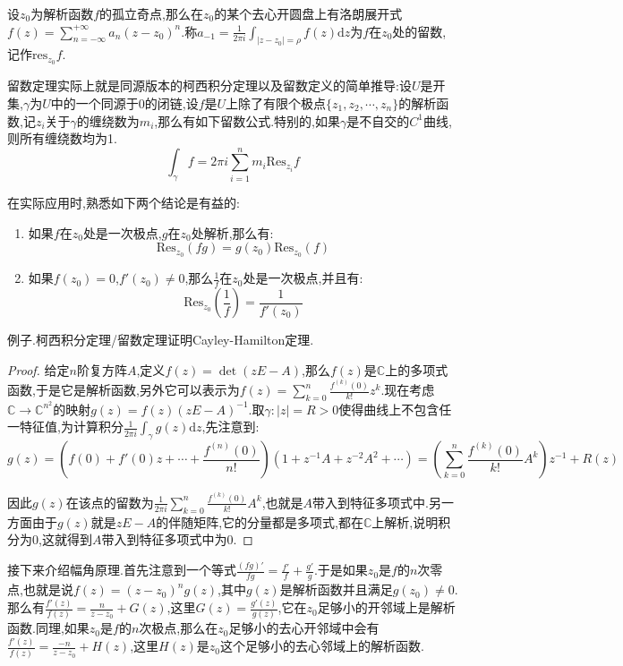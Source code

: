 设$z_0$为解析函数$f$的孤立奇点,那么在$z_0$的某个去心开圆盘上有洛朗展开式$f(z)=\sum_{n=-\infty}^{+\infty}a_n(z-z_0)^n$.称$a_{-1}=\frac{1}{2\pi i}\int_{|z-z_0|=\rho}f(z)\mathrm{d}z$为$f$在$z_0$处的留数,记作$\mathrm{res}_{z_0}f$.

留数定理实际上就是同源版本的柯西积分定理以及留数定义的简单推导:设$U$是开集,$\gamma$为$U$中的一个同源于0的闭链,设$f$是$U$上除了有限个极点$\{z_1,z_2,\cdots,z_n\}$的解析函数,记$z_i$关于$\gamma$的缠绕数为$m_i$,那么有如下留数公式.特别的,如果$\gamma$是不自交的$C^1$曲线,则所有缠绕数均为1.
$$\int_{\gamma}f=2\pi i\sum_{i=1}^{n}m_i\mathrm{Res}_{z_i}f$$

在实际应用时,熟悉如下两个结论是有益的:
\begin{enumerate}
	\item 如果$f$在$z_0$处是一次极点,$g$在$z_0$处解析,那么有:
	$$\mathrm{Res}_{z_0}(fg)=g(z_0)\mathrm{Res}_{z_0}(f)$$
	\item 如果$f(z_0)=0$,$f'(z_0)\not=0$,那么$\frac{1}{f}$在$z_0$处是一次极点,并且有:$$\mathrm{Res}_{z_0}\left(\frac{1}{f}\right)=\frac{1}{f'(z_0)}$$
\end{enumerate}

例子.柯西积分定理/留数定理证明Cayley-Hamilton定理.
\begin{proof}
	
	给定$n$阶复方阵$A$,定义$f(z)=\det(zE-A)$,那么$f(z)$是$\mathbb{C}$上的多项式函数,于是它是解析函数,另外它可以表示为$f(z)=\sum_{k=0}^n\frac{f^{(k)}(0)}{k!}z^k$.现在考虑$\mathbb{C}\to\mathbb{C}^{n^2}$的映射$g(z)=f(z)(zE-A)^{-1}$.取$\gamma:|z|=R>0$使得曲线上不包含任一特征值,为计算积分$\frac{1}{2\pi i}\int_{\gamma}g(z)\mathrm{d}z$,先注意到:
	$$g(z)=(f(0)+f'(0)z+\cdots+\frac{f^{(n)}(0)}{n!})(1+z^{-1}A+z^{-2}A^2+\cdots)=\left(\sum_{k=0}^n\frac{f^{(k)}(0)}{k!}A^k\right)z^{-1}+R(z)$$
	
	因此$g(z)$在该点的留数为$\frac{1}{2\pi i}\sum_{k=0}^n\frac{f^{(k)}(0)}{k!}A^k$,也就是$A$带入到特征多项式中.另一方面由于$g(z)$就是$zE-A$的伴随矩阵,它的分量都是多项式,都在$\mathbb{C}$上解析,说明积分为0,这就得到$A$带入到特征多项式中为0.
\end{proof}

接下来介绍幅角原理.首先注意到一个等式$\frac{(fg)'}{fg}=\frac{f'}{f}+\frac{g'}{g}$.于是如果$z_0$是$f$的$n$次零点,也就是说$f(z)=(z-z_0)^ng(z)$,其中$g(z)$是解析函数并且满足$g(z_0)\not=0$.那么有$\frac{f'(z)}{f(z)}=\frac{n}{z-z_0}+G(z)$,这里$G(z)=\frac{g'(z)}{g(z)}$,它在$z_0$足够小的开邻域上是解析函数.同理,如果$z_0$是$f$的$n$次极点,那么在$z_0$足够小的去心开邻域中会有$\frac{f'(z)}{f(z)}=\frac{-n}{z-z_0}+H(z)$,这里$H(z)$是$z_0$这个足够小的去心邻域上的解析函数.

